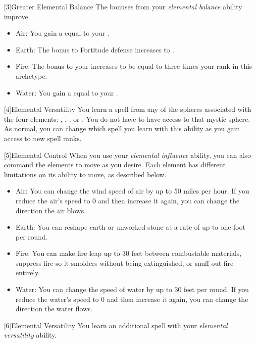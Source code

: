         [3]{Greater Elemental Balance} The bonuses from your \textit{elemental balance} ability improve.
        \begin{itemize}
            \item Air: You gain a  equal to your .
            \item Earth: The bonus to Fortitude defense increases to .
            \item Fire: The bonus to your  increases to be equal to three times your rank in this archetype.
            \item Water: You gain a  equal to your .
        \end{itemize}

        [4]{Elemental Versatility} You learn a spell from any of the spheres associated with the four elements: , , , or .
        You do not have to have access to that mystic sphere.
        As normal, you can change which spell you learn with this ability as you gain access to new spell ranks.

        [5]{Elemental Control} When you use your \textit{elemental influence} ability, you can also command the elements to move as you desire.
        Each element has different limitations on its ability to move, as described below.
        \begin{itemize}
            \item Air: You can change the wind speed of air by up to 50 miles per hour.
                If you reduce the air's speed to 0 and then increase it again, you can change the direction the air blows.
            \item Earth: You can reshape earth or unworked stone at a rate of up to one foot per round.
            \item Fire: You can make fire leap up to 30 feet between combustable materials, suppress fire so it smolders without being extinguished, or snuff out fire entirely.
            \item Water: You can change the speed of water by up to 30 feet per round.
                If you reduce the water's speed to 0 and then increase it again, you can change the direction the water flows.
        \end{itemize}

        [6]{Elemental Versatility} You learn an additional spell with your \textit{elemental versatility} ability.

